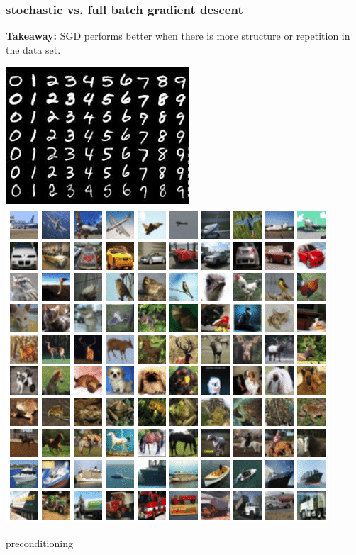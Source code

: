 \documentclass[compress]{beamer}
\begin{document}
\begin{frame}
\frametitle{stochastic vs. full batch gradient descent}
\begin{center}
	\textbf{Takeaway:} SGD performs better when there is more structure or repetition in the data set. 
	
	\includegraphics[height=.4\textheight]{mnist.jpeg}\hspace{2em}\includegraphics[height=.4\textheight]{cifar10.png}
\end{center}

\end{frame}

\begin{frame}[standout]
	\begin{center}
		\large preconditioning
	\end{center}
\end{frame}
\end{document}
